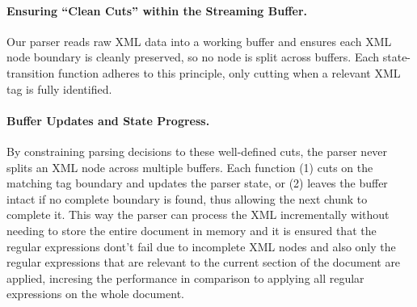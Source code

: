 \paragraph{Ensuring ``Clean Cuts'' within the Streaming Buffer.}
Our parser reads raw XML data into a working buffer and ensures each XML node boundary is cleanly preserved, so no node is split across buffers. Each state-transition function adheres to this principle, only cutting when a relevant XML tag is fully identified. 

\paragraph{Buffer Updates and State Progress.}
By constraining parsing decisions to these well-defined cuts, the parser never splits an XML node across multiple buffers. Each function (1) cuts on the matching tag boundary and updates the parser state, or (2) leaves the buffer intact if no complete boundary is found, thus allowing the next chunk to complete it. This way the parser can process the XML incrementally without needing to store the entire document in memory and it is ensured that the regular expressions dont't fail due to incomplete XML nodes and also only the regular expressions that are relevant to the current section of the document are applied, incresing the performance in comparison to applying all regular expressions on the whole document.


\begin{algorithm}
\caption{cleanRowsAndCellsInRange — apply $p_{\text{row}}$ with
cell cleanup}
\label{alg:rows-cells}
\DontPrintSemicolon
{}

\end{algorithm}


